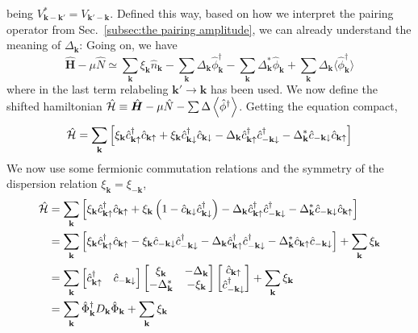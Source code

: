 being $V_{\mathbf{k}-\mathbf{k}'}^* = V_{\mathbf{k}'-\mathbf{k}}$. {\color{red}Defined this way, based on how we interpret the pairing operator from Sec.~\ref{subsec:the pairing amplitude}, we can already understand the meaning of $\Delta_\mathbf{k}$:} Going on, we have
\[
	\hat{\bm H} - \mu\hat{N} \simeq \sum_{\mathbf{k}} \xi_{\mathbf{k}} \hat n_\mathbf{k} - 
	\sum_\mathbf{k} \Delta_\mathbf{k} \hat{\phi}_\mathbf{k}^\dagger - \sum_\mathbf{k} \Delta_\mathbf{k}^* \hat{\phi}_\mathbf{k} + \sum_\mathbf{k} \Delta_\mathbf{k} \big\langle \hat{\phi}_\mathbf{k}^\dagger \big\rangle
\]
where in the last term relabeling $\mathbf{k}' \to \mathbf{k}$ has been used. We now define the shifted hamiltonian $\hat{\mathcal{H}} \equiv \hat{\bm H} - \mu\hat{N} - \sum \Delta \ev{\hat{\phi}^\dagger}$. Getting the equation compact,
\[
	\hat{\mathcal{H}} = \sum_\mathbf{k} \left[{\xi_\mathbf{k} \hat{c}_{\mathbf{k}\uparrow}^\dagger \hat{c}_{\mathbf{k}\uparrow} + \xi_\mathbf{k} \hat{c}_{\mathbf{k}\downarrow}^\dagger \hat{c}_{\mathbf{k}\downarrow} - \Delta_\mathbf{k} \hat{c}_{\mathbf{k}\uparrow}^\dagger \hat{c}_{-\mathbf{k}\downarrow}^\dagger - \Delta_\mathbf{k}^*	 \hat{c}_{-\mathbf{k}\downarrow} \hat{c}_{\mathbf{k}\uparrow} }\right]
\]
We now use some fermionic commutation relations and the symmetry of the dispersion relation $\xi_\mathbf{k} = \xi_{-\mathbf{k}}$,
\[
\begin{aligned}
	\hat{\mathcal{H}} &= \sum_\mathbf{k} \left[{\xi_\mathbf{k} \hat{c}_{\mathbf{k}\uparrow}^\dagger \hat{c}_{\mathbf{k}\uparrow} + \xi_\mathbf{k} \left({1-\hat{c}_{\mathbf{k}\downarrow} \hat{c}_{\mathbf{k}\downarrow}^\dagger}\right) - \Delta_\mathbf{k} \hat{c}_{\mathbf{k}\uparrow}^\dagger \hat{c}_{-\mathbf{k}\downarrow}^\dagger - \Delta_\mathbf{k}^*	 \hat{c}_{-\mathbf{k}\downarrow} \hat{c}_{\mathbf{k}\uparrow} }\right] \\
	&= \sum_\mathbf{k} \left[{\xi_\mathbf{k} \hat{c}_{\mathbf{k}\uparrow}^\dagger \hat{c}_{\mathbf{k}\uparrow} - \xi_\mathbf{k}
	\hat{c}_{-\mathbf{k}\downarrow} \hat{c}_{-\mathbf{k}\downarrow}^\dagger - \Delta_\mathbf{k} \hat{c}_{\mathbf{k}\uparrow}^\dagger \hat{c}_{-\mathbf{k}\downarrow}^\dagger - \Delta_\mathbf{k}^* \hat{c}_{\mathbf{k}\uparrow} \hat{c}_{-\mathbf{k}\downarrow} }\right] + \sum_\mathbf{k} \xi_\mathbf{k} \\
	&= \sum_\mathbf{k} \begin{bmatrix}
		\hat{c}_{\mathbf{k}\uparrow}^\dagger & \hat{c}_{-\mathbf{k}\downarrow}
	\end{bmatrix} \begin{bmatrix}
		\xi_\mathbf{k} & - \Delta_\mathbf{k} \\
		- \Delta_\mathbf{k}^* & - \xi_\mathbf{k}
	\end{bmatrix} \begin{bmatrix}
		\hat{c}_{\mathbf{k}\uparrow} \\
		\hat{c}_{-\mathbf{k}\downarrow}^\dagger
	\end{bmatrix} + \sum_\mathbf{k} \xi_\mathbf{k} \\
	&= \sum_\mathbf{k} \hat{\Phi}_\mathbf{k}^\dagger D_\mathbf{k} \hat{\Phi}_\mathbf{k} + \sum_\mathbf{k} \xi_\mathbf{k}
\end{aligned}
\]
